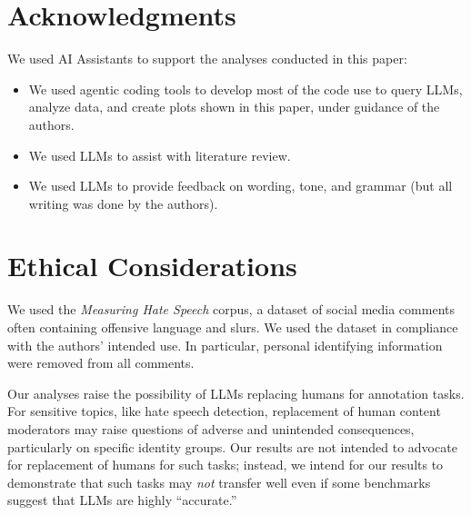 \documentclass[11pt]{article}
\begin{document}
\section*{Acknowledgments}
We used AI Assistants to support the analyses conducted in this paper:
\begin{itemize}
    \item We used agentic coding tools to develop most of the code use to query LLMs, analyze data, and create plots shown in this paper, under guidance of the authors.
    \item We used LLMs to assist with literature review.
    \item We used LLMs to provide feedback on wording, tone, and grammar (but all writing was done by the authors).
\end{itemize}

\section*{Ethical Considerations}
We used the \textit{Measuring Hate Speech} corpus, a dataset of social media comments often containing offensive language and slurs. We used the dataset in compliance with the authors' intended use. In particular, personal identifying information were removed from all comments. 

Our analyses raise the possibility of LLMs replacing humans for annotation tasks. For sensitive topics, like hate speech detection, replacement of human content moderators may raise questions of adverse and unintended consequences, particularly on specific identity groups. Our results are not intended to advocate for replacement of humans for such tasks; instead, we intend for our results to demonstrate that such tasks may \textit{not} transfer well even if some benchmarks suggest that LLMs are highly ``accurate.'' 

%



\clearpage
\appendix
\end{document}
